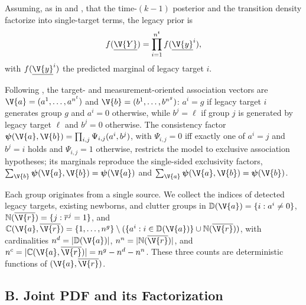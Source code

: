 Assuming, as in \cite[Eq.~(36)]{meyer2018messagepassing} and \cite[Eqs.~(1)--(4)]{meyer2021scalable}, that the time-\((k{-}1)\) posterior and the transition density factorize into single-target terms, the legacy prior is
\begin{equation}
f(\underline{\V{Y}}) = \prod_{i=1}^{n^t} f(\underline{\V{y}}^i),
\label{eq:pt_legacy_prior}
\end{equation}
with \(f(\underline{\V{y}}^i)\) the predicted marginal of legacy target \(i\).

Following \cite[Eqs.~(10),(20)]{meyer2018messagepassing}, the target- and measurement-oriented association vectors are \(\V{a}=(a^1,\dots,a^{n^t})\) and \(\V{b}=(b^1,\dots,b^{n^g})\): \(a^i=g\) if legacy target \(i\) generates group \(g\) and \(a^i=0\) otherwise, while \(b^j=\ell\) if group \(j\) is generated by legacy target \(\ell\) and \(b^j=0\) otherwise. The consistency factor \(\boldsymbol{\psi}(\V{a},\V{b})=\prod_{i,j}\Psi_{i,j}(a^i,b^j)\), with \(\Psi_{i,j}=0\) iff exactly one of \(a^i=j\) and \(b^j=i\) holds and \(\Psi_{i,j}=1\) otherwise, restricts the model to exclusive association hypotheses; its marginals reproduce the single-sided exclusivity factors, \(\sum_{\V{b}}\boldsymbol{\psi}(\V{a},\V{b})=\boldsymbol{\psi}(\V{a})\) and \(\sum_{\V{a}}\boldsymbol{\psi}(\V{a},\V{b})=\boldsymbol{\psi}(\V{b})\).

Each group originates from a single source. We collect the indices of detected legacy targets, existing newborns, and clutter groups in \(\mathbb{D}(\V{a})=\{i:a^i\neq0\}\), \(\mathbb{N}(\overline{\V{r}})=\{j:\overline{r}^j=1\}\), and \(\mathbb{C}(\V{a},\overline{\V{r}})=\{1,\dots,n^g\}\setminus(\{a^i:i\in\mathbb{D}(\V{a})\}\cup\mathbb{N}(\overline{\V{r}}))\), with cardinalities \(n^d=|\mathbb{D}(\V{a})|\), \(n^n=|\mathbb{N}(\overline{\V{r}})|\), and \(n^c=|\mathbb{C}(\V{a},\overline{\V{r}})|=n^g-n^d-n^n\). These three counts are deterministic functions of \((\V{a},\overline{\V{r}})\).

\subsection*{B. Joint \ac{PDF} and its Factorization}

